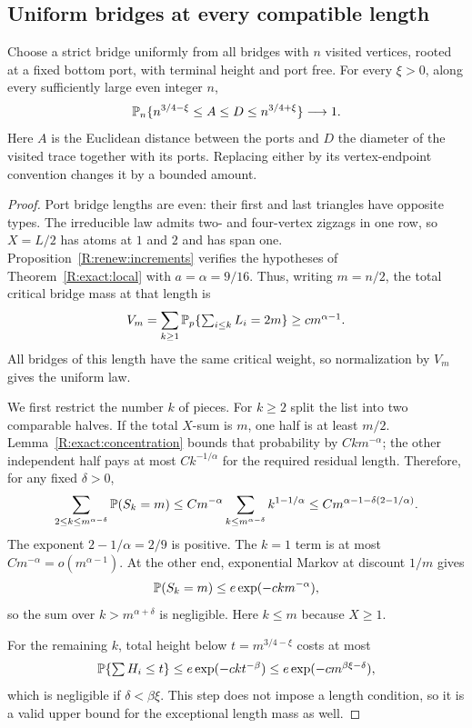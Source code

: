 \subsection{Uniform bridges at every compatible length}
\begin{theorem}\label{R:exact:bridge}
Choose a strict bridge uniformly from all bridges with $n$ visited vertices, rooted at a fixed bottom port, with terminal height and port free. For every $\xi>0$, along every sufficiently large even integer $n$,
\[
 \mathbb P_n\{n^{3/4-\xi}\le A\le D\le n^{3/4+\xi}\}\longrightarrow1.
\]
Here $A$ is the Euclidean distance between the ports and $D$ the diameter of the visited trace together with its ports. Replacing either by its vertex-endpoint convention changes it by a bounded amount.
\end{theorem}
\begin{proof}
Port bridge lengths are even: their first and last triangles have opposite types. The irreducible law admits two- and four-vertex zigzags in one row, so $X=L/2$ has atoms at $1$ and $2$ and has span one. Proposition~\ref{R:renew:increments} verifies the hypotheses of Theorem~\ref{R:exact:local} with $a=\alpha=9/16$. Thus, writing $m=n/2$, the total critical bridge mass at that length is
\[
 V_m=\sum_{k\ge1}\mathbb P_p\{\textstyle\sum_{i\le k}L_i=2m\}
 \ge c m^{\alpha-1}.
\]
All bridges of this length have the same critical weight, so normalization by $V_m$ gives the uniform law.

We first restrict the number $k$ of pieces. For $k\ge2$ split the list into two comparable halves. If the total $X$-sum is $m$, one half is at least $m/2$. Lemma~\ref{R:exact:concentration} bounds that probability by $Ckm^{-\alpha}$; the other independent half pays at most $Ck^{-1/\alpha}$ for the required residual length. Therefore, for any fixed $\delta>0$,
\[
 \sum_{2\le k\le m^{\alpha-\delta}}\mathbb P(S_k=m)
 \le C m^{-\alpha}\sum_{k\le m^{\alpha-\delta}}k^{1-1/\alpha}
 \le C m^{\alpha-1-\delta(2-1/\alpha)}.
\]
The exponent $2-1/\alpha=2/9$ is positive. The $k=1$ term is at most $Cm^{-\alpha}=o(m^{\alpha-1})$. At the other end, exponential Markov at discount $1/m$ gives
\[
 \mathbb P(S_k=m)\le e\exp(-c k m^{-\alpha}),
\]
so the sum over $k>m^{\alpha+\delta}$ is negligible. Here $k\le m$ because $X\ge1$.

For the remaining $k$, total height below $t=m^{3/4-\xi}$ costs at most
\[
 \mathbb P\{\textstyle\sum H_i\le t\}
 \le e\exp(-c k t^{-\beta})
 \le e\exp(-c m^{\beta\xi-\delta}),
\]
which is negligible if $\delta<\beta\xi$. This step does not impose a length condition, so it is a valid upper bound for the exceptional length mass as well.


\end{proof}
